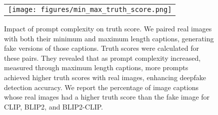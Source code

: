 \documentclass{article} \usepackage{iclr2024_conference,times}
\begin{document}
\begin{figure}[t]
  \begin{center}
    \begin{tabular}{c}
\texttt{[image: figures/min\_max\_truth\_score.png]} 
    \end{tabular}
  \end{center}
\caption{Impact of prompt complexity on truth score. We paired real images with both their minimum and maximum length captions, generating fake versions of those captions. Truth scores were calculated for these pairs. They revealed that as prompt complexity increased, measured through maximum length captions, more prompts achieved higher truth scores with real images, enhancing deepfake detection accuracy. We report the percentage of image captions whose real images had a higher truth score than the fake image for CLIP, BLIP2, and BLIP2-CLIP.}
    \label{fig:cap_complex}
\end{figure}
\end{document}
